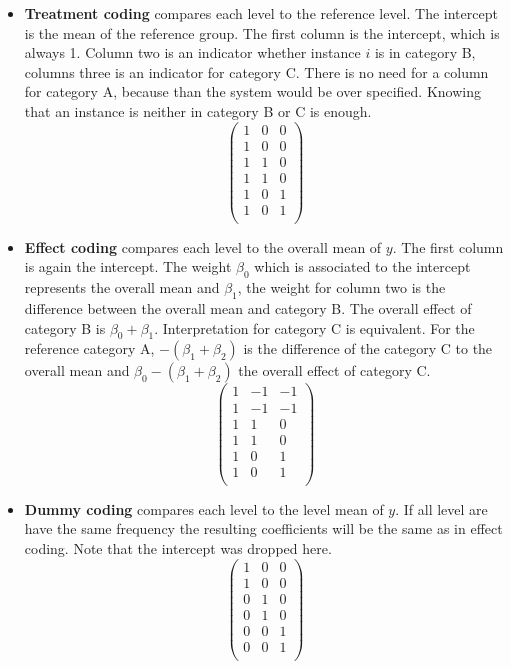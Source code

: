 \documentclass[12pt,]{krantz}
\providecommand{\tightlist}{%
  \setlength{\itemsep}{0pt}\setlength{\parskip}{0pt}}
\theoremstyle{definition}
\theoremstyle{definition}
\theoremstyle{definition}
\theoremstyle{remark}
\begin{document}
\begin{itemize}
\tightlist
\item
  \textbf{Treatment coding} compares each level to the reference level.
  The intercept is the mean of the reference group. The first column is
  the intercept, which is always 1. Column two is an indicator whether
  instance \(i\) is in category B, columns three is an indicator for
  category C. There is no need for a column for category A, because than
  the system would be over specified. Knowing that an instance is
  neither in category B or C is enough. \[
  \begin{pmatrix}
  1 & 0 & 0 \\
  1 & 0 & 0 \\
  1 & 1 & 0 \\
  1 & 1 & 0 \\
  1 & 0 & 1 \\
  1 & 0 & 1 \\
  \end{pmatrix}
  \]
\item
  \textbf{Effect coding} compares each level to the overall mean of
  \(y\). The first column is again the intercept. The weight
  \(\beta_{0}\) which is associated to the intercept represents the
  overall mean and \(\beta_{1}\), the weight for column two is the
  difference between the overall mean and category B. The overall effect
  of category B is \(\beta_{0} + \beta_{1}\). Interpretation for
  category C is equivalent. For the reference category A,
  \(-(\beta_{1} + \beta_{2})\) is the difference of the category C to
  the overall mean and \(\beta_{0} -(\beta_{1} + \beta_{2})\) the
  overall effect of category C. \[
  \begin{pmatrix}
  1 & -1 & -1 \\
  1 & -1 & -1 \\
  1 & 1 & 0 \\
  1 & 1 & 0 \\
  1 & 0 & 1 \\
  1 & 0 & 1 \\
  \end{pmatrix}
  \]
\item
  \textbf{Dummy coding} compares each level to the level mean of \(y\).
  If all level are have the same frequency the resulting coefficients
  will be the same as in effect coding. Note that the intercept was
  dropped here. \[
  \begin{pmatrix}
  1 & 0 & 0 \\
  1 & 0 & 0 \\
  0 & 1 & 0 \\
  0 & 1 & 0 \\
  0 & 0 & 1 \\
  0 & 0 & 1 \\
  \end{pmatrix}
  \]
\end{itemize}
\end{document}
